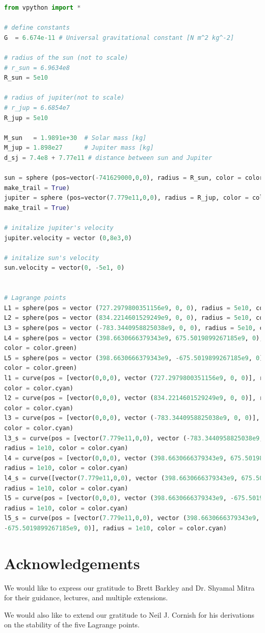 \documentclass[linenumbers,RNAAS,trackchanges]{aastex631}
\begin{document}
\begin{lstlisting}[language=Python]
from vpython import *

# define constants
G  = 6.674e-11 # Universal gravitational constant [N m^2 kg^-2]

# radius of the sun (not to scale)
# r_sun = 6.9634e8
R_sun = 5e10

# radius of jupiter(not to scale)
# r_jup = 6.6854e7
R_jup = 5e10

M_sun   = 1.9891e+30  # Solar mass [kg]
M_jup = 1.898e27      # Jupiter mass [kg]
d_sj = 7.4e8 + 7.77e11 # distance between sun and Jupiter

sun = sphere (pos=vector(-741629000,0,0), radius = R_sun, color = color.yellow, \ 
make_trail = True)
jupiter = sphere (pos=vector(7.779e11,0,0), radius = R_jup, color = color.blue, \ 
make_trail = True)

# initalize jupiter's velocity
jupiter.velocity = vector (0,8e3,0)

# initalize sun's velocity
sun.velocity = vector(0, -5e1, 0)


# Lagrange points
L1 = sphere(pos = vector (727.2979800351156e9, 0, 0), radius = 5e10, color = color.green)
L2 = sphere(pos = vector (834.2214601529249e9, 0, 0), radius = 5e10, color = color.green)
L3 = sphere(pos = vector (-783.3440958825038e9, 0, 0), radius = 5e10, color = color.green)
L4 = sphere(pos = vector (398.6630666379343e9, 675.5019899267185e9, 0), radius = 5e10, \ 
color = color.green)
L5 = sphere(pos = vector (398.6630666379343e9, -675.5019899267185e9, 0), radius = 5e10, \ 
color = color.green)
l1 = curve(pos = [vector(0,0,0), vector (727.2979800351156e9, 0, 0)], radius = 1e10, \ 
color = color.cyan)
l2 = curve(pos = [vector(0,0,0), vector (834.2214601529249e9, 0, 0)], radius = 1e10, \ 
color = color.cyan)
l3 = curve(pos = [vector(0,0,0), vector (-783.3440958825038e9, 0, 0)], radius = 1e10, \ 
color = color.cyan)
l3_s = curve(pos = [vector(7.779e11,0,0), vector (-783.3440958825038e9, 0, 0)], \ 
radius = 1e10, color = color.cyan)
l4 = curve(pos = [vector(0,0,0), vector (398.6630666379343e9, 675.5019899267185e9, 0)], \ 
radius = 1e10, color = color.cyan)
l4_s = curve([vector(7.779e11,0,0), vector (398.6630666379343e9, 675.5019899267185e9, 0)], \ 
radius = 1e10, color = color.cyan)
l5 = curve(pos = [vector(0,0,0), vector (398.6630666379343e9, -675.5019899267185e9, 0)],\ 
radius = 1e10, color = color.cyan)
l5_s = curve(pos = [vector(7.779e11,0,0), vector (398.6630666379343e9, \
-675.5019899267185e9, 0)], radius = 1e10, color = color.cyan)


\end{lstlisting}



\newpage




\section{Acknowledgements} \label{sec:acknowledgements}
We would like to express our gratitude to Brett Barkley and Dr. Shyamal Mitra for their guidance, lectures, and multiple extensions. 

We would also like to extend our gratitude to Neil J. Cornish for his derivations on the stability of the five Lagrange points.  
\end{document}

